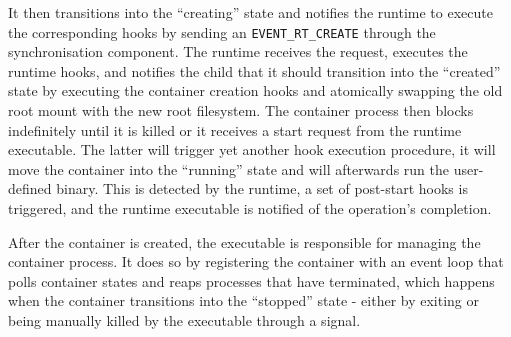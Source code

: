 It then transitions into the \enquote{creating} state and notifies the runtime to execute the 
corresponding hooks by sending an \verb|EVENT_RT_CREATE| through the synchronisation component. 
The runtime receives the request, executes the runtime hooks, and notifies the child that it should transition 
into the \enquote{created} state by executing the container creation hooks and atomically swapping the old root mount 
with the new root filesystem. The container process then blocks indefinitely until it is killed 
or it receives a start request from the runtime executable. The latter will trigger yet another 
hook execution procedure, it will move the container into the \enquote{running} state and will afterwards run the user-defined binary. 
This is detected 
by the runtime, a set of post-start hooks is triggered, and the runtime executable is notified 
of the operation's completion.  

After the container is created, the executable is responsible for 
managing the container process. It does so by registering the container with an event loop that
polls container states and reaps processes that have terminated, which happens when the container 
transitions into the \enquote{stopped} state - either by exiting or being manually killed by the executable through 
a signal. 



